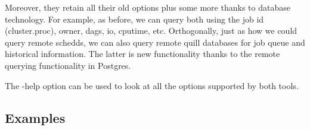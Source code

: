 \begin{enumerate}
Moreover, they retain all their old options plus some more thanks to
database technology.  For example, as before, we can query both using
the job id (cluster.proc), owner, dags, io, cputime, etc.  Orthogonally,
just as how we could query remote schedds, we can also query remote quill
databases for job queue and historical information.  The latter is new
functionality thanks to the remote querying functionality in Postgres.

The -help option can be used to look at all the options supported by
both tools.
\end{enumerate}


\subsection{\label{sec:Quill-Example}Examples}


